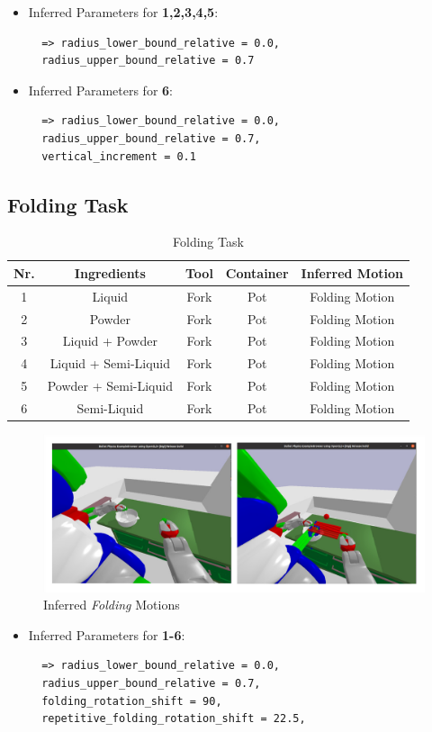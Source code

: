 \begin{itemize}
\item Inferred Parameters for \textbf{1,2,3,4,5}: 
 \begin{lstlisting}
  => radius_lower_bound_relative = 0.0, 
  radius_upper_bound_relative = 0.7
\end{lstlisting}
\item Inferred Parameters for \textbf{6}:
\begin{lstlisting}
  => radius_lower_bound_relative = 0.0, 
  radius_upper_bound_relative = 0.7,
  vertical_increment = 0.1
\end{lstlisting}
\end{itemize}

\subsection*{Folding Task}
\begin{table}[H]
  \centering
  \begin{tabular}{|c|c|c|c|c|}
    \hline
    \textbf{Nr.} & \textbf{Ingredients} & \textbf{Tool} & \textbf{Container} & \textbf{Inferred Motion}  \\
    \hline
    1 & Liquid & Fork & Pot & Folding Motion \\
    \hline
    2 & Powder & Fork & Pot & Folding Motion \\
    \hline
    3 & Liquid + Powder & Fork & Pot & Folding Motion \\
    \hline
    4 & Liquid + Semi-Liquid & Fork & Pot & Folding Motion \\
    \hline
    5 & Powder + Semi-Liquid & Fork & Pot & Folding Motion \\
    \hline
    6 & Semi-Liquid & Fork & Pot & Folding Motion \\
    \hline
  \end{tabular}
  \caption{Folding Task}
  \label{tab:mixingtask}
\end{table}
\begin{figure}[H]
  \includegraphics[scale=0.25]{Graphics/folding_evaluation.jpg}
  \caption{Inferred \textit{Folding} Motions}
  \label{fig:mixingverb WikiHow}
\end{figure}
\begin{itemize}
\item Inferred Parameters for \textbf{1-6}: 
 \begin{lstlisting}
  => radius_lower_bound_relative = 0.0, 
  radius_upper_bound_relative = 0.7,
  folding_rotation_shift = 90, 
  repetitive_folding_rotation_shift = 22.5,
\end{lstlisting}
\end{itemize}